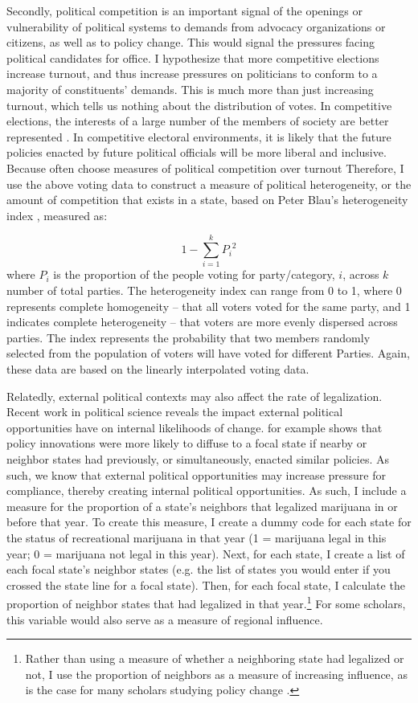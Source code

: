Secondly, political competition is an important signal of the openings or vulnerability of political systems to demands from advocacy organizations or citizens, as well as to policy change. This would signal the pressures facing political candidates for office. I hypothesize that more competitive elections increase turnout, and thus increase pressures on politicians to conform to a majority of constituents' demands. This is much more than just increasing turnout, which tells us nothing about the distribution of votes. In competitive elections, the interests of a large number of the members of society are better represented \citep{soule_and_olzak_2004}. In competitive electoral environments, it is likely that the future policies enacted by future political officials will be more liberal and inclusive. Because often choose measures of political competition over turnout Therefore, I use the above voting data to construct a measure of political heterogeneity, or the amount of competition that exists in a state, based on Peter Blau's heterogeneity index \citep{blau_1977a}, measured as:

\begin{equation}
1 - \sum_{i = 1}^{k}{P_{i}}^2
\end{equation}
where $P_{i}$ is the proportion of the people voting for party/category, $i$, across $k$ number of total parties. The heterogeneity index can range from 0 to 1, where 0 represents complete homogeneity -- that all voters voted for the same party, and 1 indicates complete heterogeneity -- that voters are more evenly dispersed across parties. The index represents the probability that two members randomly selected from the population of voters will have voted for different Parties. Again, these data are based on the linearly interpolated voting data.

Relatedly, external political contexts may also affect the rate of legalization. Recent work in political science reveals the impact external political opportunities have on internal likelihoods of change. \citet{boushey_2016} for example shows that policy innovations were more likely to diffuse to a focal state if nearby or neighbor states had previously, or simultaneously, enacted similar policies. As such, we know that external political opportunities may increase pressure for compliance, thereby creating internal political opportunities. As such, I include a measure for the proportion of a state's neighbors that legalized marijuana in or before that year. To create this measure, I create a dummy code for each state for the status of recreational marijuana in that year (1 = marijuana legal in this year; 0 = marijuana not legal in this year). Next, for each state, I create a list of each focal state's neighbor states (e.g. the list of states you would enter if you crossed the state line for a focal state). Then, for each focal state, I calculate the proportion of neighbor states that had legalized in that year.\footnote{Rather than using a measure of whether a neighboring state had legalized or not, I use the proportion of neighbors as a measure of increasing influence, as is the case for many scholars studying policy change \citep{boushey_2016,key_1949}.} For some scholars, this variable would also serve as a measure of regional influence.

